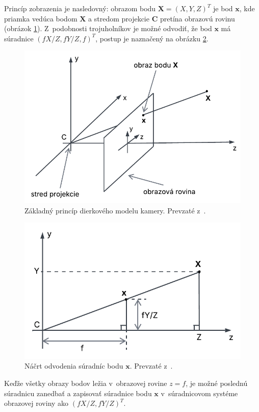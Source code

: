 Princíp zobrazenia je nasledovný: obrazom bodu $\mathbf{X} = (X, Y, Z)^T$ je bod $\mathbf{x}$, kde priamka vedúca bodom $\mathbf{X}$ a stredom projekcie $\mathbf{C}$ pretína obrazovú rovinu (obrázok \ref{fig:model_kamery1}). Z~podobnosti trojuholníkov je možné odvodiť, že bod $\mathbf{x}$ má súradnice $(fX/Z, fY/Z, f)^T$, postup je naznačený na obrázku \ref{fig:model_kamery2}.

\begin{figure}[h!]
    \centering
    \includegraphics[width=0.7\linewidth]{text_prace/obrazky-figures/model_kamery1.pdf}
    \caption[Základný princíp dierkového modelu kamery.]{Základný princíp dierkového modelu kamery. Prevzaté z~\cite{multiple_view_geometry}.}
    \label{fig:model_kamery1}
\end{figure}

\begin{figure}[h!]
    \centering
    \includegraphics[width=0.7\linewidth]{text_prace/obrazky-figures/model_kamery2.pdf}
    \caption[Náčrt odvodenia súradníc zobrazovaného bodu u~dierkového modelu kamery.]{Náčrt odvodenia súradníc bodu $\mathbf{x}$. Prevzaté z~\cite{multiple_view_geometry}.}
    \label{fig:model_kamery2}
\end{figure}

Keďže všetky obrazy bodov ležia v~obrazovej rovine $z = f$, je možné poslednú súradnicu zanedbať a zapisovať súradnice bodu $\mathbf{x}$ v~súradnicovom systéme obrazovej roviny ako $(fX/Z, fY/Z)^T$.

